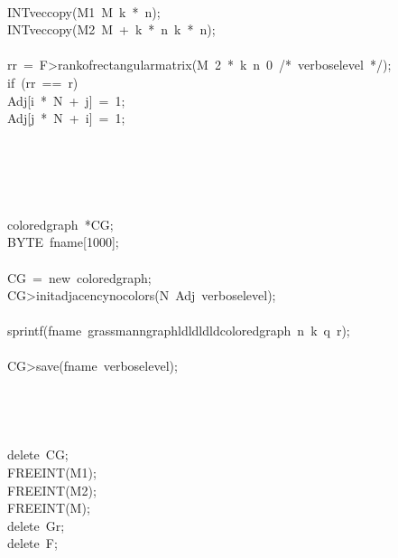 \begin{tabbing}
\>\>\\[0pt]
\>\>\>INTveccopy(M1\ M\ k\ *\ n);\\[0pt]
\>\>\>INTveccopy(M2\ M\ +\ k\ *\ n\ k\ *\ n);\\[0pt]
\\[0pt]
\>\>\>rr\ =\ F>rankofrectangularmatrix(M\ 2\ *\ k\ n\ 0\ /*\ verboselevel\ */);\\[0pt]
\>\>\>if\ (rr\ ==\ r)\ \\[0pt]
\>\>\>\>Adj[i\ *\ N\ +\ j]\ =\ 1;\\[0pt]
\>\>\>\>Adj[j\ *\ N\ +\ i]\ =\ 1;\\[0pt]
\>\>\>\>\\[0pt]
\>\>\>\\[0pt]
\>\>\\[0pt]
\\[0pt]
\\[0pt]
\>coloredgraph\ *CG;\\[0pt]
\>BYTE\ fname[1000];\\[0pt]
\\[0pt]
\>CG\ =\ new\ coloredgraph;\\[0pt]
\>CG>initadjacencynocolors(N\ Adj\ verboselevel);\\[0pt]
\\[0pt]
\>sprintf(fname\ grassmanngraphldldldldcoloredgraph\ n\ k\ q\ r);\\[0pt]
\\[0pt]
\>CG>save(fname\ verboselevel);\\[0pt]
\\[0pt]
\\[0pt]
\>\\[0pt]
\\[0pt]
\>delete\ CG;\\[0pt]
\>FREEINT(M1);\\[0pt]
\>FREEINT(M2);\\[0pt]
\>FREEINT(M);\\[0pt]
\>delete\ Gr;\\[0pt]
\>delete\ F;\\[0pt]
\\[0pt]
\\[0pt]
\\[0pt]
\end{tabbing}

